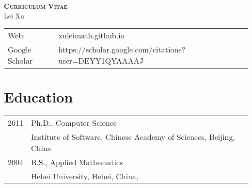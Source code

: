 





\begin{center}
    \textbf{\textsc{Curriculum Vitae}}\\
    Lei Xu
\end{center}

\begin{longtable}{p{1in}p{5in}}
    Web: &	xuleimath.github.io\\
    Google Scholar     &  https://scholar.google.com/citations?user=DEYY1QYAAAAJ \\
\end{longtable}

\section*{Education}

\begin{longtable}{p{1in}p{5in}}
    2011 &	Ph.D., Computer Science\\
         &  Institute of Software, Chinese Academy of Sciences, Beijing, China\\
    2004 &	B.S., Applied Mathematics\\
         &  Hebei University, Hebei, China, \\
\end{longtable}


